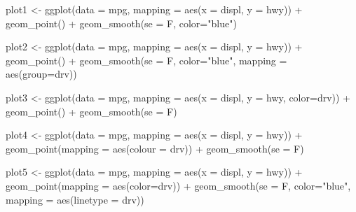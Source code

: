 \documentclass[
]{article}
\newenvironment{Shaded}{\begin{snugshade}}{\end{snugshade}}
\newcommand{\AttributeTok}[1]{\textcolor[rgb]{0.77,0.63,0.00}{#1}}
\newcommand{\FunctionTok}[1]{\textcolor[rgb]{0.00,0.00,0.00}{#1}}
\newcommand{\NormalTok}[1]{#1}
\newcommand{\OtherTok}[1]{\textcolor[rgb]{0.56,0.35,0.01}{#1}}
\newcommand{\SpecialCharTok}[1]{\textcolor[rgb]{0.00,0.00,0.00}{#1}}
\newcommand{\StringTok}[1]{\textcolor[rgb]{0.31,0.60,0.02}{#1}}
\begin{document}
\begin{Shaded}
\begin{Highlighting}[]
\NormalTok{plot1 }\OtherTok{\textless{}{-}} \FunctionTok{ggplot}\NormalTok{(}\AttributeTok{data =}\NormalTok{ mpg, }\AttributeTok{mapping =} \FunctionTok{aes}\NormalTok{(}\AttributeTok{x =}\NormalTok{ displ, }\AttributeTok{y =}\NormalTok{ hwy)) }\SpecialCharTok{+} 
  \FunctionTok{geom\_point}\NormalTok{() }\SpecialCharTok{+} 
  \FunctionTok{geom\_smooth}\NormalTok{(}\AttributeTok{se =}\NormalTok{ F, }\AttributeTok{color=}\StringTok{"blue"}\NormalTok{)}

\NormalTok{plot2 }\OtherTok{\textless{}{-}} \FunctionTok{ggplot}\NormalTok{(}\AttributeTok{data =}\NormalTok{ mpg, }\AttributeTok{mapping =} \FunctionTok{aes}\NormalTok{(}\AttributeTok{x =}\NormalTok{ displ, }\AttributeTok{y =}\NormalTok{ hwy)) }\SpecialCharTok{+} 
  \FunctionTok{geom\_point}\NormalTok{() }\SpecialCharTok{+} 
  \FunctionTok{geom\_smooth}\NormalTok{(}\AttributeTok{se =}\NormalTok{ F, }\AttributeTok{color=}\StringTok{"blue"}\NormalTok{, }\AttributeTok{mapping =} \FunctionTok{aes}\NormalTok{(}\AttributeTok{group=}\NormalTok{drv))}

\NormalTok{plot3 }\OtherTok{\textless{}{-}} \FunctionTok{ggplot}\NormalTok{(}\AttributeTok{data =}\NormalTok{ mpg, }\AttributeTok{mapping =} \FunctionTok{aes}\NormalTok{(}\AttributeTok{x =}\NormalTok{ displ, }\AttributeTok{y =}\NormalTok{ hwy, }\AttributeTok{color=}\NormalTok{drv)) }\SpecialCharTok{+} 
  \FunctionTok{geom\_point}\NormalTok{() }\SpecialCharTok{+} 
  \FunctionTok{geom\_smooth}\NormalTok{(}\AttributeTok{se =}\NormalTok{ F)}

\NormalTok{plot4 }\OtherTok{\textless{}{-}} \FunctionTok{ggplot}\NormalTok{(}\AttributeTok{data =}\NormalTok{ mpg, }\AttributeTok{mapping =} \FunctionTok{aes}\NormalTok{(}\AttributeTok{x =}\NormalTok{ displ, }\AttributeTok{y =}\NormalTok{ hwy)) }\SpecialCharTok{+}
  \FunctionTok{geom\_point}\NormalTok{(}\AttributeTok{mapping =} \FunctionTok{aes}\NormalTok{(}\AttributeTok{colour =}\NormalTok{ drv)) }\SpecialCharTok{+} 
  \FunctionTok{geom\_smooth}\NormalTok{(}\AttributeTok{se =}\NormalTok{ F)}

\NormalTok{plot5 }\OtherTok{\textless{}{-}} \FunctionTok{ggplot}\NormalTok{(}\AttributeTok{data =}\NormalTok{ mpg, }\AttributeTok{mapping =} \FunctionTok{aes}\NormalTok{(}\AttributeTok{x =}\NormalTok{ displ, }\AttributeTok{y =}\NormalTok{ hwy)) }\SpecialCharTok{+}
  \FunctionTok{geom\_point}\NormalTok{(}\AttributeTok{mapping =} \FunctionTok{aes}\NormalTok{(}\AttributeTok{color=}\NormalTok{drv)) }\SpecialCharTok{+} 
  \FunctionTok{geom\_smooth}\NormalTok{(}\AttributeTok{se =}\NormalTok{ F, }\AttributeTok{color=}\StringTok{"blue"}\NormalTok{, }\AttributeTok{mapping =} \FunctionTok{aes}\NormalTok{(}\AttributeTok{linetype =}\NormalTok{ drv))}


\end{Highlighting}
\end{Shaded}
\end{document}
